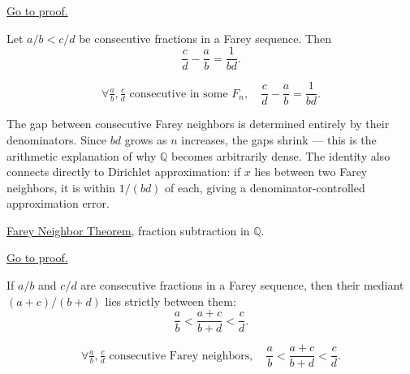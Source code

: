 \begin{remark*}[Proof]
\hyperref[prf:farey-neighbor-theorem]{Go to proof.}
\end{remark*}

\begin{theorem}
\label{thm:farey-gap}
Let $a/b < c/d$ be consecutive fractions in a Farey sequence.  Then
\[
\frac{c}{d} - \frac{a}{b} = \frac{1}{bd}.
\]
\end{theorem}

\begin{remark*}
\[
\forall \tfrac{a}{b}, \tfrac{c}{d} \text{ consecutive in some } F_n,\quad
\frac{c}{d} - \frac{a}{b} = \frac{1}{bd}.
\]
\end{remark*}

\begin{remark*}[Interpretation]
The gap between consecutive Farey neighbors is determined entirely by
their denominators.  Since $bd$ grows as $n$ increases, the gaps shrink —
this is the arithmetic explanation of why $\mathbb{Q}$ becomes arbitrarily
dense.  The identity also connects directly to Dirichlet approximation:
if $x$ lies between two Farey neighbors, it is within $1/(bd)$ of each,
giving a denominator-controlled approximation error.
\end{remark*}

\begin{remark*}[Dependencies]
\hyperref[thm:farey-neighbor-theorem]{Farey Neighbor Theorem},
fraction subtraction in $\mathbb{Q}$.
\end{remark*}

\begin{remark*}[Proof]
\hyperref[prf:farey-gap]{Go to proof.}
\end{remark*}

\begin{theorem}
\label{thm:farey-mediant-property}
If $a/b$ and $c/d$ are consecutive fractions in a Farey sequence, then
their mediant $(a+c)/(b+d)$ lies strictly between them:
\[
\frac{a}{b} < \frac{a+c}{b+d} < \frac{c}{d}.
\]
\end{theorem}

\begin{remark*}
\[
\forall \tfrac{a}{b}, \tfrac{c}{d} \text{ consecutive Farey neighbors},\quad
\frac{a}{b} < \frac{a+c}{b+d} < \frac{c}{d}.
\]
\end{remark*}

